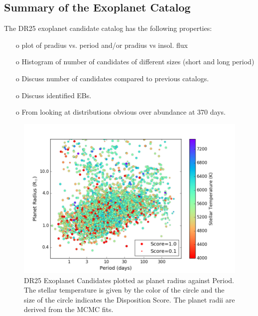 \subsection{Summary of the Exoplanet Catalog}
The DR25 exoplanet candidate catalog has the following properties:
\begin{itemize}
    \item [o] plot of pradius vs. period and/or pradius vs insol. flux
    \item [o] Histogram of number of candidates of different sizes (short and long period)
    \item [o] Discuss number of candidates compared to previous catalogs.
    \item [o] Discuss identified EBs.
    \item [o] From looking at distributions obvious over abundance at 370 days.
\end{itemize}

\begin{figure}
    \centering
    \includegraphics[width=1.1\linewidth]{fig-CatalogRadiusPeriodScore.png}
    \caption{DR25 Exoplanet Candidates plotted as planet radius against Period. The stellar temperature is given by the color of the circle and the size of the circle indicates the Disposition Score. The planet radii are derived from the MCMC fits. }
    \label{f:catalogPlot}
\end{figure}